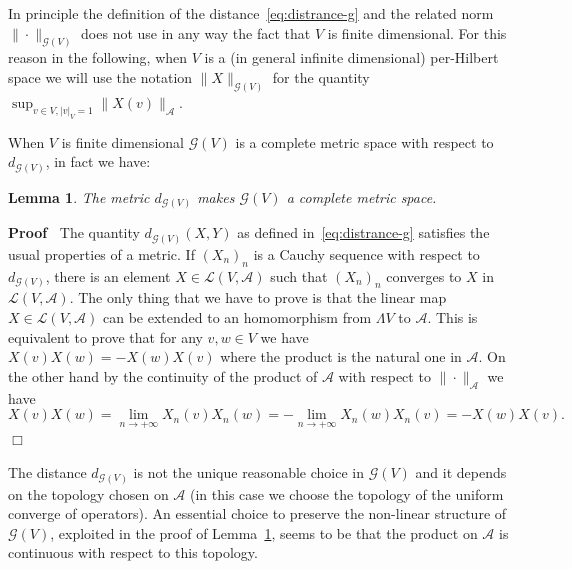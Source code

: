 \documentclass[11pt]{article}
\newenvironment{proof}{\noindent\textbf{Proof\ }}{\hspace*{\fill}$\Box$\medskip}
\newtheorem{lemma}{Lemma}
\begin{document}
\begin{remark}
  \label{remark_infinitenorm}In principle the definition of the
  distance~{\eqref{eq:distrance-g}} and the related norm $\| \cdot
  \|_{\mathcal{G} (V)}$ does not use in any way the fact that $V$ is finite
  dimensional. For this reason in the following, when $V$ is a (in general
  infinite dimensional) per-Hilbert space we will use the notation $\| X
  \|_{\mathcal{G} (V)}$ for the quantity $\sup_{v \in V, | v |_V = 1} \| X (v)
  \|_{\mathcal{A}}$.
\end{remark}

When $V$ is finite dimensional $\mathcal{G} (V)$ is a complete metric space
with respect to $d_{\mathcal{G} (V)}$, in fact we have:

\begin{lemma}
  \label{lemma_completeness}The metric $d_{\mathcal{G} (V)}$ makes
  $\mathcal{G} (V)$ a complete metric space.
\end{lemma}

\begin{proof}
  The quantity $d_{\mathcal{G} (V)} (X, Y)$ as defined
  in~{\eqref{eq:distrance-g}} satisfies the usual properties of a metric. If
  $(X_n)_n$ is a Cauchy sequence with respect to $d_{\mathcal{G} (V)}$, there
  is an element $X \in \mathcal{L} (V, \mathcal{A})$ such that $(X_n)_n$
  converges to $X$ in $\mathcal{L} (V, \mathcal{A})$. The only thing that we
  have to prove is that the linear map $X \in \mathcal{L} (V, \mathcal{A})$
  can be extended to an homomorphism from $\Lambda V$ to $\mathcal{A}$. This
  is equivalent to prove that for any $v, w \in V$ we have $X (v) X (w) = - X
  (w) X (v)$ where the product is the natural one in $\mathcal{A}$. On the
  other hand by the continuity of the product of $\mathcal{A}$ with respect to
  $\| \cdot \|_{\mathcal{A}}$ we have
  \[ X (v) X (w) = \lim_{n \rightarrow + \infty} X_n (v) X_n (w) = - \lim_{n
     \rightarrow + \infty} X_n (w) X_n (v) = - X (w) X (v) . \]
\end{proof}

\begin{remark}
  The distance $d_{\mathcal{G} (V)}$ is not the unique reasonable choice in
  $\mathcal{G} (V)$ and it depends on the topology chosen on $\mathcal{A}$ (in
  this case we choose the topology of the uniform converge of operators). An
  essential choice to preserve the non-linear structure of $\mathcal{G} (V)$,
  exploited in the proof of Lemma~\ref{lemma_completeness}, seems to be that
  the product on $\mathcal{A}$ is continuous with respect to this topology. 
\end{remark}
\end{document}
